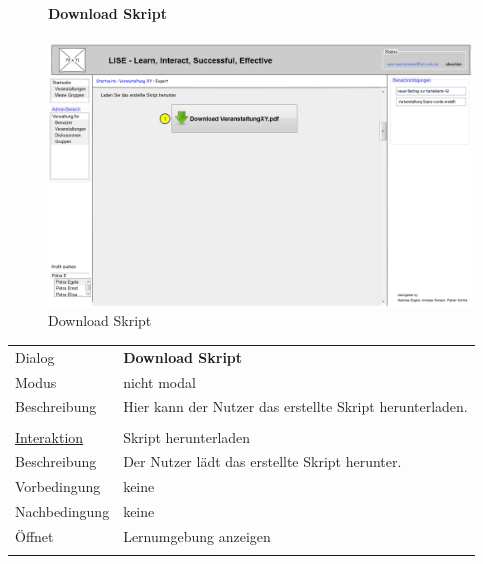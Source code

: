 \documentclass[12pt,a4paper]{article}
\begin{document}
{\begin{figure}[H]
	\centering
	\paragraph{Download Skript}
	\includegraphics[width=\textwidth]{Bilder/Mockups/GUI/DonwloadSkript.png}
	\caption{Download Skript}
	\label{GuiDownloadSkript}
\end{figure}
\begin{tabular}{l p{12cm}}
	Dialog 	 & \textbf{Download Skript} \\ 
	Modus & nicht modal\\ 
	Beschreibung   	& Hier kann der Nutzer das erstellte Skript herunterladen. \\\\
	
	\underline{Interaktion} 	 & Skript herunterladen\\ 
	Beschreibung   	& Der Nutzer lädt das erstellte Skript herunter.\\
	Vorbedingung	& keine \\
	Nachbedingung	& keine \\
	Öffnet			& Lernumgebung anzeigen\\\\
\end{tabular}

\begin{figure}[H]
	\centering

\end{figure}}
\end{document}
